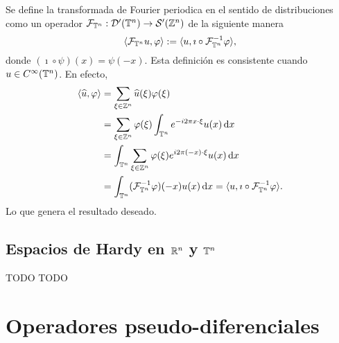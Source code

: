 \begin{definition}
	Se define la transformada de Fourier periodica en el sentido de distribuciones como un operador $\mathcal{F}_{\mathbb{T}^n}:\mathcal{D}'(\mathbb{T}^n)\to\mathcal{S}'(\mathbb{Z}^n)$ de la siguiente manera
	\begin{equation*}
		\langle\mathcal{F}_{\mathbb{T}^n}u, \varphi\rangle := \langle u, \imath \circ \mathcal{F}_{\mathbb{T}^n}^{-1}\varphi\rangle,
	\end{equation*}
	donde $(\imath\circ\psi)(x) = \psi(-x)$. Esta definición es consistente cuando $u\in C^\infty(\mathbb{T}^n)$. En efecto, 
	\begin{align*}
		\langle\widehat{u}, \varphi\rangle &= \sum_{\xi\in\mathbb{Z}^n}\widehat{u}(\xi)\varphi(\xi)\\
		& = \sum_{\xi\in\mathbb{Z}^n} \varphi(\xi) \int_{\mathbb{T}^n}e^{-i2\pi x\cdot\xi}  u(x) \mathop{}\!\mathrm{d} x \\
		& =\int_{\mathbb{T}^n}  \sum_{\xi\in\mathbb{Z}^n} \varphi(\xi) e^{i2\pi (-x)\cdot\xi}u(x)\mathop{}\!\mathrm{d} x \\
		& = \int_{\mathbb{T}^n} (\mathcal{F}_{\mathbb{T}^n}^{-1}\varphi)(-x) u(x) \mathop{}\!\mathrm{d} x = \langle u, \imath\circ \mathcal{F}_{\mathbb{T}^n}^{-1}\varphi\rangle.
	\end{align*}
	Lo que genera el resultado deseado.
\end{definition}

\section{Espacios de Hardy en $\mathbb{R}^n$ y $\mathbb{T}^n$}
TODO TODO


\chapter{Operadores pseudo-diferenciales}

